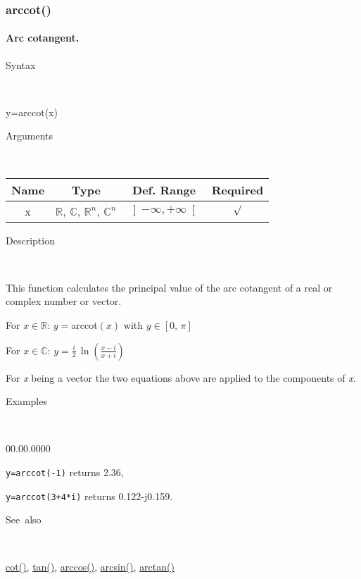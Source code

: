 \newpage
\subsubsection*{\hypertarget{arccot}{}{\Large arccot()}}


\paragraph{\label{par:Arc-cotangent}Arc cotangent.}

\begin{description}
\item [Syntax]~
\end{description}
y=arccot(x)

\begin{description}
\item [Arguments]~
\end{description}
\begin{tabular}{|c|c|c|c|}
\hline 
Name&
Type&
Def. Range&
Required\tabularnewline
\hline
\hline 
x&
$\mathbb{R}$, $\mathbb{C}$, $\mathbb{R}^{n}$, $\mathbb{C}^{n}$&
$\left]-\infty,+\infty\right[$&
$\surd$\tabularnewline
\hline
\end{tabular}

\begin{description}
\item [Description]~
\end{description}
This function calculates the principal value of the arc cotangent
of a real or complex number or vector.

\medskip{}
For $x\in\mathbb{R}$: $y=$arccot$\left(x\right)$ with $y\in\left[0,\,\pi\right]$

\medskip{}
For $x\in\mathbb{C}$: $y=$${\displaystyle \frac{i}{2}\,\ln\left(\frac{x-i}{x+i}\right)}$
\medskip{}

For \textit{x} being a vector the two equations above are
applied to the components of \textit{x}.

\begin{description}
\item [Examples]~
\end{description}
\begin{lyxlist}{00.00.0000}
\item [\texttt{y=arccot(-1)}]returns 2.36,
\item [\texttt{y=arccot(3+4{*}i)}]returns 0.122-j0.159.
\end{lyxlist}
\begin{description}
\item [See~also]~
\end{description}
\textcolor{blue}{\hyperlink{cot}{cot()}}\textcolor{black}{,} \textcolor{blue}{\hyperlink{tan}{tan()}}\textcolor{black}{,}
\textcolor{blue}{\hyperlink{arccos}{arccos()}}\textcolor{black}{,}
\textcolor{blue}{\hyperlink{arcsin}{arcsin()}}\textcolor{black}{,}
\textcolor{blue}{\hyperlink{arctan}{arctan()}}

